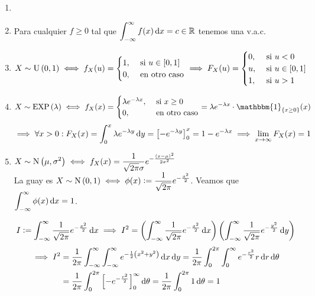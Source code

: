 \begin{ejem}
	\begin{enumerate}
		\item[]
		\item Para cualquier $f\geq 0$ tal que $\ds \int_{-\infty}^{\infty} f(x) \odif{x} = c \in \R$ tenemos una v.a.c.
		\item $\displaystyle X\sim\operatorname{U}\left(0,1\right) \iff f_X(u)=\begin{cases}
				      1, & \text{ si } u\in[0,1] \\
				      0, & \text{ en otro caso}
			      \end{cases} \implies F_X(u) = \begin{cases}
				      0, & \text{ si } u<0       \\
				      u, & \text{ si } u\in[0,1] \\
				      1, & \text{ si } u>1
			      \end{cases}$
		\item $\ds X\sim\EXP{\lambda} \iff f_X(x) = \begin{cases}
				      \lambda e^{-\lambda x}, & \text{ si } x\geq 0  \\
				      0,                      & \text{ en otro caso}
			      \end{cases} = \lambda e^{-\lambda x} \cdot \mathbbm{1}_{\{x\geq 0\}}(x)$
		      \[\implies \forall x > 0 : F_X(x) = \int_{0}^{x} \lambda e^{-\lambda y} \odif{y} = \left[-e^{-\lambda y}\right]_{0}^{x} = 1-e^{-\lambda x} \implies \lim_{x\to\infty} F_X(x) = 1\]
		\item $\displaystyle X\sim\operatorname{N}\left(\mu, \sigma^2\right) \iff f_X(x) = \frac{1}{\sqrt{2\pi}\sigma} e^{-\frac{(x-\mu)^2}{2\sigma^2}}$ \\
		      La guay es $\displaystyle X\sim\operatorname{N}\left(0, 1\right) \iff \phi(x) \vcentcolon= \frac{1}{\sqrt{2\pi}} e^{-\frac{x^2}{2}}$. Veamos que $\ds \int_{-\infty}^{\infty} \phi(x) \odif{x} = 1$.
		      \begin{dem}
			      \[I \defeq \int_{-\infty}^{\infty} \frac{1}{\sqrt{2\pi}} e^{-\frac{x^2}{2}} \odif{x}\implies I^2 = \left(\int_{-\infty}^{\infty} \frac{1}{\sqrt{2\pi}} e^{-\frac{x^2}{2}}\odif{x}\right)\left(\int_{-\infty}^{\infty} \frac{1}{\sqrt{2\pi}} e^{-\frac{y^2}{2}} \odif{y}\right)\]
			      \[\begin{aligned} \implies I^2 & = \frac{1}{2\pi} \int_{-\infty}^{\infty} \int_{-\infty}^{\infty} e^{-\frac{1}{2}\left(x^2+y^2\right)} \odif{x} \odif{y} = \frac{1}{2\pi} \int_{0}^{2\pi} \int_{0}^{\infty} e^{-\frac{r^2}{2}} r \odif{r} \odif{\theta} \\
                             & = \frac{1}{2\pi} \int_{0}^{2\pi} \left[-e^{-\frac{r^2}{2}}\right]_{0}^{\infty} \odif{\theta} = \frac{1}{2\pi} \int_{0}^{2\pi} 1 \odif{\theta} = 1
				      \end{aligned}\]
		      \end{dem}
	\end{enumerate}
\end{ejem}

